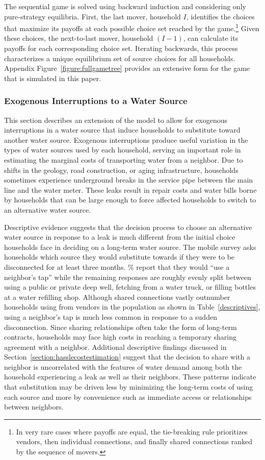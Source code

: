 \documentclass[12pt]{article}
\begin{document}
The sequential game is solved using backward induction and considering only pure-strategy equilibria.  First, the last mover, household $I$, identifies the choices that maximize its payoffs at each possible choice set reached by the game.\footnote{In very rare cases where payoffs are equal, the tie-breaking rule prioritizes vendors, then individual connections, and finally shared connections ranked by the sequence of movers.}  Given these choices, the next-to-last mover, household $(I-1)$, can calculate its payoffs for each corresponding choice set.  Iterating backwards, this process characterizes a unique equilibrium set of source choices for all households.  Appendix Figure~\ref{figure:fullgametree} provides an extensive form for the game that is simulated in this paper.


\subsubsection{Exogenous Interruptions to a Water Source}\label{section:hasslemodel}

This section describes an extension of the model to allow for exogenous interruptions in a water source that induce households to substitute toward another water source.  Exogenous interruptions produce useful variation in the types of water sources used by each household, serving an important role in estimating the marginal costs of transporting water from a neighbor.  Due to shifts in the geology, road construction, or aging infrastructure, households sometimes experience underground breaks in the service pipe between the main line and the water meter.  These leaks result in repair costs and water bills borne by households that can be large enough to force affected households to switch to an alternative water source.

Descriptive evidence suggests that the decision process to choose an alternative water source in response to a leak is much different from the initial choice households face in deciding on a long-term water source.  The mobile survey asks households which source they would substitute towards if they were to be disconnected for at least three months.  \unskip\% report that they would ``use a neighbor's tap'' while the remaining responses are roughly evenly split between using a public or private deep well, fetching from a water truck, or filling bottles at a water refilling shop.  Although shared connections vastly outnumber households using from vendors in the population as shown in Table~\ref{descriptives}, using a neighbor's tap is much less common in response to a sudden disconnection.  Since sharing relationships often take the form of long-term contracts, households may face high costs in reaching a temporary sharing agreement with a neighbor.  Additional descriptive findings discussed in Section~\ref{section:hasslecostestimation} suggest that the decision to share with a neighbor is uncorrelated with the features of water demand among both the household experiencing a leak as well as their neighbors.  These patterns indicate that substitution may be driven less by minimizing the long-term costs of using each source and more by convenience such as immediate access or relationships between neighbors.
\end{document}
